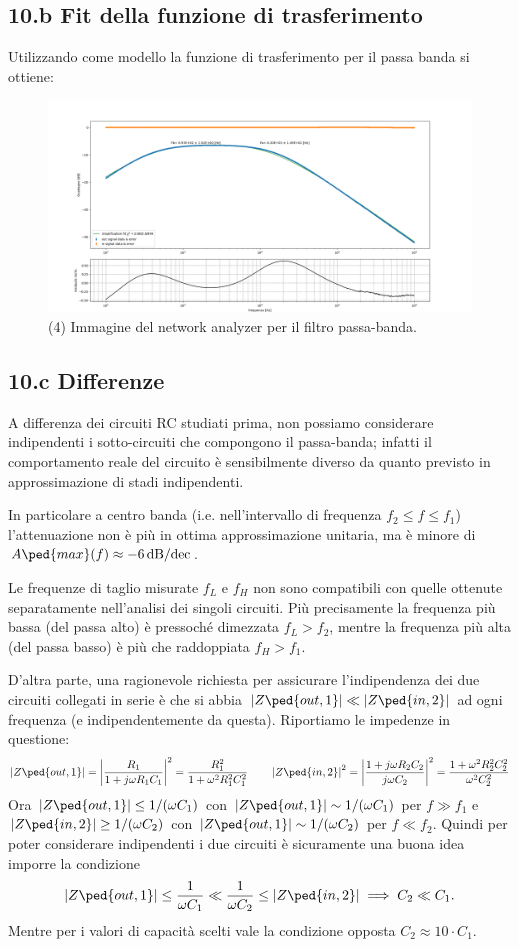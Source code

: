 \documentclass[10pt,a4paper]{article}
\begin{document}
\subsection*{10.b Fit della funzione di trasferimento}
Utilizzando come modello la funzione di trasferimento per il passa banda si ottiene:

\begin{figure}[H]
\centering
\includegraphics[scale=0.35]{passa_banda}
\caption{(4) Immagine del network analyzer per il filtro passa-banda.}
\end{figure}
\subsection*{10.c Differenze}
A differenza dei circuiti RC studiati prima, non possiamo considerare
indipendenti i sotto-circuiti che compongono il passa-banda; infatti il
comportamento reale del circuito è sensibilmente diverso da quanto previsto in 
approssimazione di stadi indipendenti.

In particolare a centro banda (i.e. nell'intervallo di frequenza
$f_2 \leq f \leq f_1$) l'attenuazione non è più in ottima approssimazione
unitaria, ma è minore di $A\ped{max}(f) \approx \SI{-6}{\dB/dec}$.

Le frequenze di taglio misurate $f_L$ e $f_H$ non sono compatibili con quelle
ottenute separatamente nell'analisi dei singoli circuiti. Più precisamente
la frequenza più bassa (del passa alto) è pressoché dimezzata
$f_L > f_2$, mentre la frequenza più alta (del passa basso) è più che
raddoppiata $f_H > f_1$.

D'altra parte, una ragionevole richiesta per assicurare l'indipendenza dei due
circuiti collegati in serie è che si abbia
$\abs{Z\ped{out, 1}} \ll \abs{Z\ped{in,2}}$ ad ogni frequenza (e 
indipendentemente da questa). Riportiamo le impedenze in questione:
\[
\abs{Z\ped{out, 1}} = \abs{\frac{R_1}{1 + j \omega R_1 C_1}}^2 = 
\frac{R_1^2}{1 + \omega^2 R_1^2 C_1^2}
\qquad
\abs{Z\ped{in, 2}}^2 = \abs{\frac{1 + j \omega R_2 C_2}{j\omega 
C_2}}^2 = \frac{1 + \omega^2 R_2^2 C_2^2}{\omega^2 C_2^2}
\]
Ora $\abs{Z\ped{out, 1}} \leq 1/(\omega C_1)$ con $\abs{Z\ped{out, 
1}} \sim 1/(\omega C_1)$ per $f \gg f_1 $ e $\abs{Z\ped{in, 2}} 
\geq 1/(\omega C_2)$ con $\abs{Z\ped{out, 1}} \sim 1/(\omega C_2) 
$ per $ f \ll f_2 $. Quindi per poter considerare indipendenti i due circuiti
è sicuramente una buona idea imporre la condizione
\[
\abs{Z\ped{out, 1}} \leq \frac{1}{\omega C_1} \ll \frac{1}{\omega C_2} \leq 
\abs{Z\ped{in, 2}} \implies C_2 \ll C_1.
\]
Mentre per i valori di capacità scelti vale la condizione opposta
$C_2 \approx 10 \cdot C_1$.
\end{document}

